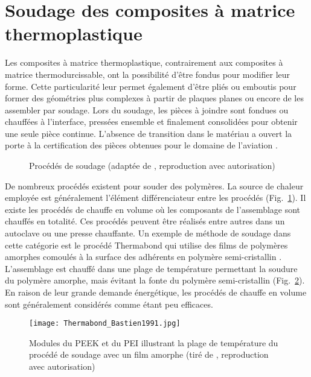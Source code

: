 \section{Soudage des composites à matrice thermoplastique}

Les composites à matrice thermoplastique, contrairement aux composites à matrice thermodurcissable, ont la possibilité d'être fondus pour modifier leur forme. 
Cette particularité leur permet également d'être pliés ou emboutis pour former des géométries plus complexes à partir de plaques planes ou encore de les assembler par soudage. 
Lors du soudage, les pièces à joindre sont fondues ou chauffées à l'interface, pressées ensemble et finalement consolidées pour obtenir une seule pièce continue. 
L'absence de transition dans le matériau a ouvert la porte à la certification des pièces obtenues pour le domaine de l'aviation \cite{Gardiner2018}. 

\begin{figure}[h]
	\centering
	\resizebox{0.75\textwidth}{!}{
		}
	\caption{Procédés de soudage (adaptée de \cite{Ageorges2001a}, reproduction avec autorisation)}
	\label{fig:arbre_procédé_soudage}
\end{figure}

\FloatBarrier
De nombreux procédés existent pour souder des polymères. 
La source de chaleur employée est généralement l'élément différenciateur entre les procédés (Fig.~\ref{fig:arbre_procédé_soudage}). 
Il existe les procédés de chauffe en volume où les composants de l'assemblage sont chauffés en totalité. 
Ces procédés peuvent être réalisés entre autres dans un autoclave ou une presse chauffante. 
Un exemple de méthode de soudage dans cette catégorie est le procédé Thermabond qui utilise des films de polymères amorphes comoulés à la surface des adhérents en polymère semi-cristallin \cite{Smiley1991a}. 
L'assemblage est chauffé dans une plage de température permettant la soudure du polymère amorphe, mais évitant la fonte du polymère semi-cristallin (Fig.~\ref{fig:thermabond_process}). 
En raison de leur grande demande énergétique, les procédés de chauffe en volume sont généralement considérés comme étant peu efficaces. 

\begin{figure}[h]
	\centering
	\texttt{[image: Thermabond\_Bastien1991.jpg]}
	\caption{Modules du PEEK et du PEI illustrant la plage de température du procédé de soudage avec un film amorphe (tiré de \cite{Bastien1991}, reproduction avec autorisation)}
	\label{fig:thermabond_process}
\end{figure}

